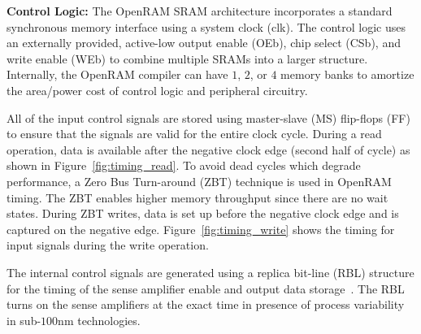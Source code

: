 

{\bf Control Logic:} The OpenRAM SRAM architecture incorporates a
standard synchronous memory interface using a system clock (clk). The
control logic uses an externally provided, active-low output enable
(OEb), chip select (CSb), and write enable (WEb) to combine multiple
SRAMs into a larger structure. Internally, the OpenRAM compiler can
have $1$, $2$, or $4$ memory banks to amortize the area/power cost of
control logic and peripheral circuitry.

All of the input control signals are stored using master-slave (MS)
flip-flops (FF) to ensure that the signals are valid for the entire
clock cycle. During a read operation, data is available after the
negative clock edge (second half of cycle) as shown in
Figure~\ref{fig:timing_read}. To avoid dead cycles which degrade
performance, a Zero Bus Turn-around (ZBT) technique is used in OpenRAM
timing. The ZBT enables higher memory throughput since there are no
wait states. During ZBT writes, data is set up before the negative
clock edge and is captured on the negative edge. Figure~\ref{fig:timing_write}
shows the timing for input signals during the write operation.

The internal control signals are generated using a replica bit-line (RBL)
structure for the timing of the sense amplifier enable and output
data storage~\cite{RBL:1998}. The RBL turns on the sense amplifiers 
at the exact time in presence of process variability in sub-$100$nm 
technologies.


